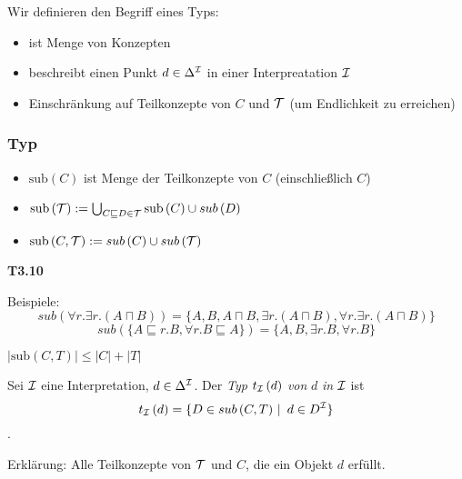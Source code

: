 Wir definieren den Begriff eines Typs:

\begin{itemize}
  \item ist Menge von Konzepten
  \item beschreibt einen Punkt $d \in \Delta^{\mathcal{I}}$ in einer Interpreatation $\mathcal{I}$
  \item Einschränkung auf Teilkonzepte von $C$ und $\mathcal{T}$ (um Endlichkeit zu erreichen)
\end{itemize}

\subsubsection{Typ}\label{typ}

\begin{definition}[Teilkonzepte]
\begin{itemize}
\item
  $\text{sub}\left( C \right)$ ist Menge der Teilkonzepte von $C$
  (einschließlich $C$)
\item
  $\text{sub}\left( \mathcal{T} \right) := \bigcup_{C \sqsubseteq D \in \mathcal{T}}^{}{\text{sub}\left( C \right) \cup sub\left( D \right)}$
\item
  $\text{sub}\left( C,\mathcal{T} \right) := sub\left( C \right) \cup sub\left( \mathcal{T} \right)$
\end{itemize}
\end{definition}

\textbf{T3.10}

Beispiele: $$sub(\forall r.\exists r.(A \sqcap B)) = \{A,B,A \sqcap B, \exists r.(A \sqcap B), \forall r.\exists r.(A \sqcap B)\}$$
$$sub(\{A \sqsubseteq r.B, \forall r.B \sqsubseteq A\}) = \{A,B, \exists r.B, \forall r.B\}$$

\begin{lemma}

$\left| \text{sub}\left( C,T \right) \right| \leq \left| C \right| + \left| T \right|$
\end{lemma}

\begin{definition}

Sei $\mathcal{I}$ eine Interpretation, $d \in \Delta^{\mathcal{I}}$. Der \emph{Typ}
$t_{\mathcal{I}}\left( d \right)$ \emph{von} $d$ \emph{in} $\mathcal{I}$ ist
$$t_{\mathcal{I}}\left( d \right) = \left\{ D \in sub\left( C,T \right)\  \right|\ d \in D^{\mathcal{I}}\}$$.
\end{definition}
Erklärung: Alle Teilkonzepte von $\mathcal{T}$ und $C$, die ein Objekt $d$
erfüllt.

